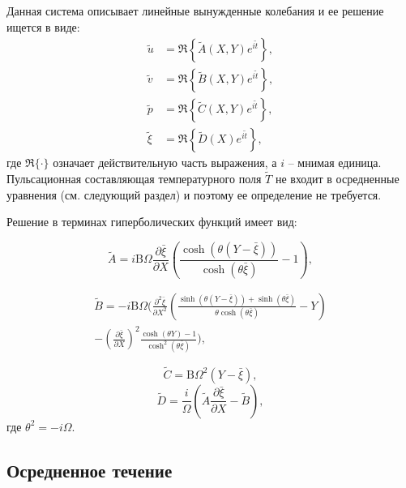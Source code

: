 \documentclass[12pt,a4paper]{article}
\begin{document}
Данная система описывает линейные вынужденные колебания и ее решение ищется в виде:
\begin{align*}
	\tilde{u} &= \Re \left\{ \tilde{A}(X,Y) e^{i \tilde{t}} \right\}, \\
	\tilde{v} &= \Re \left\{ \tilde{B}(X,Y) e^{i \tilde{t}} \right\}, \\
	\tilde{p} &= \Re \left\{ \tilde{C}(X,Y) e^{i \tilde{t}} \right\}, \\
	\tilde{\xi} &=\Re \left\{ \tilde{D}(X) e^{i \tilde{t}} \right\},
\end{align*}
где \( \Re\{\cdot\} \) означает действительную часть выражения, а \( i \) -- мнимая единица. Пульсационная составляющая температурного поля $\tilde{T}$ не входит в осредненные уравнения (см. следующий раздел) и поэтому ее определение не требуется. 

Решение в терминах гиперболических функций имеет вид:

\begin{equation}
	\tilde{A} = i \mathrm{B} \Omega \frac{\partial \bar{\xi}}{\partial X} \left (\frac{\cosh(\theta(Y-\bar{\xi}))}{\cosh(\theta \bar{\xi})} - 1 \right),
\end{equation}

\begin{equation}
	\begin{split}
		\tilde{B} = - i \mathrm{B} \Omega \Biggl(
		\frac{\partial^2 {\bar{\xi}}}{\partial X^2}
		\left(
		\frac{\sinh(\theta(Y-\bar{\xi}))+\sinh(\theta\bar{\xi})}
		{\theta \cosh(\theta \bar{\xi})}
		- Y
		\right)
		\\
		- \left(\frac{\partial \bar{\xi}}{\partial X} \right)^2 \frac{\cosh(\theta Y) - 1}{\cosh^2(\theta \bar{\xi})}  
		\Biggr),
	\end{split}
\end{equation}

\begin{equation}
	\tilde{C} =\mathrm{B} \Omega^2 \left(Y-\bar{\xi}\right),
\end{equation}
\begin{equation}
	\tilde{D} = \frac{i}{\Omega}  \left( \tilde{A} \frac{\partial \bar{\xi}}{\partial X} - \tilde{B} \right),
\end{equation}
где $\theta^2 = -i \Omega$.

\subsection{Осредненное течение}
\end{document}
